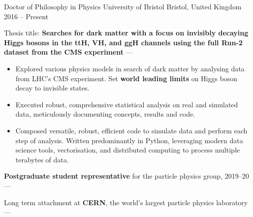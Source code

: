 
\newcommand{\vpaddingEduNorm}{\vspace{1mm}} %
\newcommand{\vpaddingEduSubpoint}{\vspace{0.75mm}} %


\begin{cventries}
    \cventry
        {Doctor of Philosophy in Physics} %
        {University of Bristol} %
        {Bristol, United Kingdom} %
        {2016 -- Present} %
        {
        \begin{cvitems} %
            \item {Thesis title: \textbf{Searches for dark matter with a focus on invisibly decaying Higgs bosons in the ttH, VH, and ggH channels using the full Run-2 dataset from the CMS experiment} --- }
            \vpaddingEduSubpoint
            \begin{itemize}
                \item[\bullet]{Explored various physics models in search of dark matter by analysing data from LHC's CMS experiment. Set \textbf{world leading limits} on Higgs boson decay to invisible states.}
                \vpaddingEduSubpoint
                \item[\bullet]{Executed robust, comprehensive statistical analysis on real and simulated data, meticulously documenting concepts, results and code.}
                \vpaddingEduSubpoint
                \item[\bullet]{Composed versatile, robust, efficient code to simulate data and perform each step of analysis. Written predominantly in Python, leveraging modern data science tools, vectorisation, and distributed computing to process multiple terabytes of data.}
            \end{itemize}
            \vpaddingEduNorm
            \item {\textbf{Postgraduate student representative} for the particle physics group, 2019--20 --- }
            \vpaddingEduNorm
            \item {Long term attachment at \textbf{CERN}, the world's largest particle physics laboratory --- }

\end{cvitems}}
\end{cventries}
